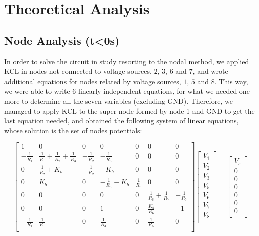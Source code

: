 \section{Theoretical Analysis}
\label{sec:analysis}

\subsection{Node Analysis (t<0s)}
\label{subsec:nodeanalysis}


In order to solve the circuit in study resorting to the nodal method, we applied KCL in nodes not connected to voltage sources, $2$, $3$, $6$ and $7$, and wrote additional equations for nodes related by voltage sources, $1$, $5$ and $8$. This way, we were able to write 6 linearly independent equations, for what we needed one more to determine all the seven variables (excluding GND). Therefore, we managed to apply KCL to the super-node formed by node 1 and GND to get the last equation needed, and obtained the following system of linear equations, whose solution is the set of nodes potentials:

\[
{\begin{bmatrix}
1 & 0 & 0 & 0 & 0 & 0 & 0\\
-\frac{1}{R_1} & \frac{1}{R_1}+\frac{1}{R_2}+\frac{1}{R_3} & -\frac{1}{R_2} & -\frac{1}{R_3} & 0 & 0 & 0\\
0 & \frac{1}{R_2}+K_b & -\frac{1}{R_2} & -K_b & 0 & 0 & 0\\
0 & K_b & 0 & -\frac{1}{R_5}-K_b & \frac{1}{R_5} & 0 & 0\\
0 & 0 & 0 & 0 & 0 & \frac{1}{R_6}+\frac{1}{R_7} & -\frac{1}{R_7}\\
0 & 0 & 0 & 1 & 0 & \frac{K_d}{R_6} & -1\\
-\frac{1}{R_1} & \frac{1}{R_1} & 0 & \frac{1}{R_4} & 0 & \frac{1}{R_6} & 0\\
            \end{bmatrix}
            }
{\begin{bmatrix}
V_1\\
V_2\\
V_3\\
V_5\\
V_6\\
V_7\\
V_8\\
            \end{bmatrix}
            }
    =
{\begin{bmatrix}
V_s\\
0\\
0\\
0\\
0\\
0\\
0\\
            \end{bmatrix}
            }
\]

